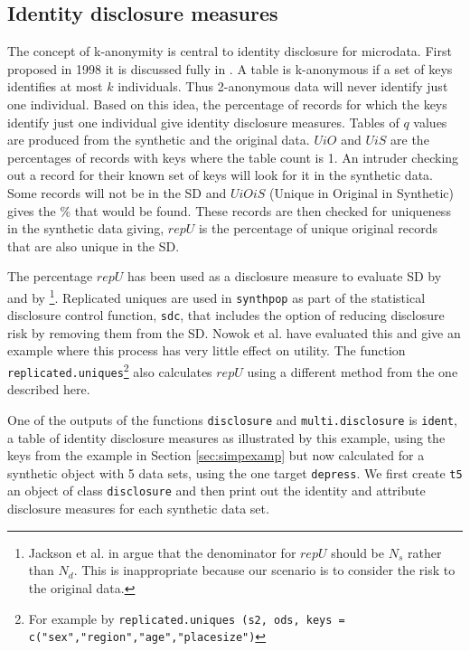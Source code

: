 \documentclass[12pt]{article}
\begin{document}
\subsection{Identity disclosure measures}\label{subsec:ident} 
The concept of k-anonymity is central to identity disclosure for microdata. First proposed in 1998 \cite{kanon1} it is discussed fully in \cite{elliotanonframe}. A table is k-anonymous if a set of keys identifies at most $k$ individuals. Thus 2-anonymous data will never identify just one individual. Based on this idea, the percentage of records for which the keys identify just one individual give identity disclosure measures. 
 Tables of $q$ values are produced from the synthetic and the original data. $UiO$ and $UiS$ are the percentages of records with keys where the table count is 1. An intruder checking out a record for their known set of keys will look for it in the synthetic data. Some records
will not be in the SD and $UiOiS$ (Unique in Original in Synthetic) gives the \% that would be found. These records are then checked for uniqueness in the
synthetic data giving, $repU$ is the percentage of unique original records that are also unique in the SD.

The percentage $repU$ has been used as a disclosure measure to evaluate SD by \cite{jackson_rss} and by \cite{raab22} \footnote{Jackson et al. in \cite{jackson_rss} argue that the denominator for $repU$ should be $N_s$ rather than $N_d$. This is inappropriate because our scenario is to consider the risk to the original data.}.
Replicated uniques are used in \texttt{synthpop} as part of the statistical disclosure control function, \texttt{sdc}, that includes the option of reducing disclosure risk by removing them from the SD. Nowok et al. \cite{nowok_repu} have evaluated this and give an example where this process has very little effect on utility. The function \texttt{replicated.uniques}\footnote{For example by \texttt{replicated.uniques (s2, ods, keys = c("sex","region","age","placesize")} } also calculates $repU$ using a different method from the one described here.

One of the outputs of the functions \texttt{disclosure} and \texttt{multi.disclosure} is \texttt{ident}, a table of identity disclosure measures as illustrated by this example, using the keys from the example in Section \ref{sec:simpexamp} but now calculated for a synthetic object with 5 data sets, using the one target \texttt{depress}. We first create \texttt{t5} an object of class \texttt{disclosure} and then print out the identity and attribute disclosure measures for each synthetic data set.
\end{document}
